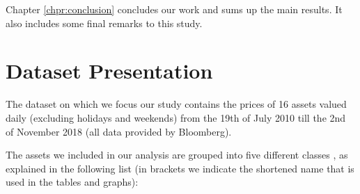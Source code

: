 \bigskip
\noindent
Chapter \ref{chpr:conclusion} concludes our work and sums up the main results. It also includes some final remarks to this study.

\bigskip

\section{Dataset  Presentation}
\bigskip
The dataset on which we focus our study contains the prices of 16 assets valued daily (excluding holidays and weekends) from the 19th of July 2010 till the 2nd of November 2018 (all data provided by Bloomberg).

The assets we included in our analysis are grouped into five different classes , as explained in the following list (in brackets we indicate the shortened name that is used in the tables and graphs):

